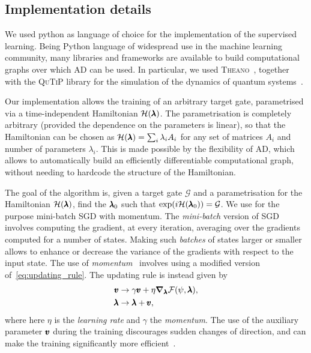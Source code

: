 \subsection{Implementation details}
\label{subsec:implementation_details}

We used python as language of choice for the implementation of the supervised learning.
Being Python language of widespread use in the machine learning community, many libraries and frameworks are available to build computational graphs over which \ac{AD} can be used.
In particular, we used \textsc{Theano}~\cite{team2016theano}, together with the \textsc{QuTiP} library for the simulation of the dynamics of quantum systems~\cite{johansson2012qutip,johansson2013qutip}.

Our implementation allows the training of an arbitrary target gate, parametrised via a time-independent Hamiltonian $\mathcal H(\pmb{\lambda})$.
The parametrisation is completely arbitrary (provided the dependence on the parameters is linear), so that the Hamiltonian can be chosen as $\mathcal H(\pmb{\lambda})=\sum_i \lambda_i A_i$ for any set of matrices $A_i$ and number of parameters $\lambda_i$.
This is made possible by the flexibility of \ac{AD}, which allows to automatically build an efficiently differentiable computational graph, without needing to hardcode the structure of the Hamiltonian.

The goal of the algorithm is, given a target gate $\mathcal G$ and a parametrisation for the Hamiltonian $\mathcal H(\pmb{\lambda})$, find the $\pmb{\lambda}_0$ such that $\exp(i\mathcal H(\pmb{\lambda}_0))=\mathcal G$.
We use for the purpose mini-batch \ac{SGD} with momentum.
The \emph{mini-batch} version of \ac{SGD} involves computing the gradient, at every iteration, averaging over the gradients computed for a number of states.
Making such \emph{batches} of states larger or smaller allows to enhance or decrease the variance of the gradients with respect to the input state.
The use of \emph{momentum}~\cite{ruder2016overview,goh2017momentum} involves using a modified version of~\cref{eq:updating_rule}.
The updating rule is instead given by
\begin{equation}
\begin{aligned}
	\pmb{v} &\to \gamma \pmb{v} + \eta \grad_{\pmb{\lambda}} \mathcal{F}(\psi, \pmb{\lambda}), \\
	\pmb{\lambda} &\to \pmb{\lambda} + \pmb{v},
\end{aligned}
\label{eq:updating_rule_momentum}
\end{equation}
where here $\eta$ is the \emph{learning rate} and $\gamma$ the \emph{momentum}.
The use of the auxiliary parameter $\pmb{v}$ during the training discourages sudden changes of direction, and can make the training significantly more efficient~\cite{goh2017momentum}.

